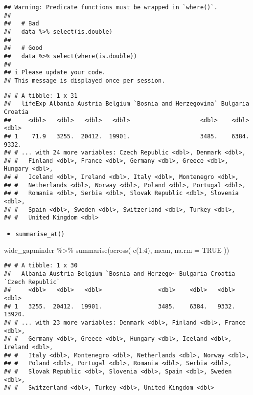 \documentclass[
]{book}
\newenvironment{Shaded}{\begin{snugshade}}{\end{snugshade}}
\newcommand{\AttributeTok}[1]{\textcolor[rgb]{0.77,0.63,0.00}{#1}}
\newcommand{\ConstantTok}[1]{\textcolor[rgb]{0.00,0.00,0.00}{#1}}
\newcommand{\DecValTok}[1]{\textcolor[rgb]{0.00,0.00,0.81}{#1}}
\newcommand{\FunctionTok}[1]{\textcolor[rgb]{0.00,0.00,0.00}{#1}}
\newcommand{\NormalTok}[1]{#1}
\newcommand{\SpecialCharTok}[1]{\textcolor[rgb]{0.00,0.00,0.00}{#1}}
\providecommand{\tightlist}{%
  \setlength{\itemsep}{0pt}\setlength{\parskip}{0pt}}
\begin{document}
\begin{verbatim}
## Warning: Predicate functions must be wrapped in `where()`.
## 
##   # Bad
##   data %>% select(is.double)
## 
##   # Good
##   data %>% select(where(is.double))
## 
## i Please update your code.
## This message is displayed once per session.
\end{verbatim}

\begin{verbatim}
## # A tibble: 1 x 31
##   lifeExp Albania Austria Belgium `Bosnia and Herzegovina` Bulgaria Croatia
##     <dbl>   <dbl>   <dbl>   <dbl>                    <dbl>    <dbl>   <dbl>
## 1    71.9   3255.  20412.  19901.                    3485.    6384.   9332.
## # ... with 24 more variables: Czech Republic <dbl>, Denmark <dbl>,
## #   Finland <dbl>, France <dbl>, Germany <dbl>, Greece <dbl>, Hungary <dbl>,
## #   Iceland <dbl>, Ireland <dbl>, Italy <dbl>, Montenegro <dbl>,
## #   Netherlands <dbl>, Norway <dbl>, Poland <dbl>, Portugal <dbl>,
## #   Romania <dbl>, Serbia <dbl>, Slovak Republic <dbl>, Slovenia <dbl>,
## #   Spain <dbl>, Sweden <dbl>, Switzerland <dbl>, Turkey <dbl>,
## #   United Kingdom <dbl>
\end{verbatim}

\begin{itemize}
\tightlist
\item
  \texttt{summarise\_at()}
\end{itemize}

\begin{Shaded}
\begin{Highlighting}[]
\NormalTok{wide\_gapminder }\SpecialCharTok{\%\textgreater{}\%}
  \FunctionTok{summarise}\NormalTok{(}\FunctionTok{across}\NormalTok{(}\SpecialCharTok{{-}}\FunctionTok{c}\NormalTok{(}\DecValTok{1}\SpecialCharTok{:}\DecValTok{4}\NormalTok{),}
\NormalTok{    mean,}
    \AttributeTok{na.rm =} \ConstantTok{TRUE}
\NormalTok{  ))}
\end{Highlighting}
\end{Shaded}

\begin{verbatim}
## # A tibble: 1 x 30
##   Albania Austria Belgium `Bosnia and Herzego~ Bulgaria Croatia `Czech Republic`
##     <dbl>   <dbl>   <dbl>                <dbl>    <dbl>   <dbl>            <dbl>
## 1   3255.  20412.  19901.                3485.    6384.   9332.           13920.
## # ... with 23 more variables: Denmark <dbl>, Finland <dbl>, France <dbl>,
## #   Germany <dbl>, Greece <dbl>, Hungary <dbl>, Iceland <dbl>, Ireland <dbl>,
## #   Italy <dbl>, Montenegro <dbl>, Netherlands <dbl>, Norway <dbl>,
## #   Poland <dbl>, Portugal <dbl>, Romania <dbl>, Serbia <dbl>,
## #   Slovak Republic <dbl>, Slovenia <dbl>, Spain <dbl>, Sweden <dbl>,
## #   Switzerland <dbl>, Turkey <dbl>, United Kingdom <dbl>
\end{verbatim}
\end{document}
